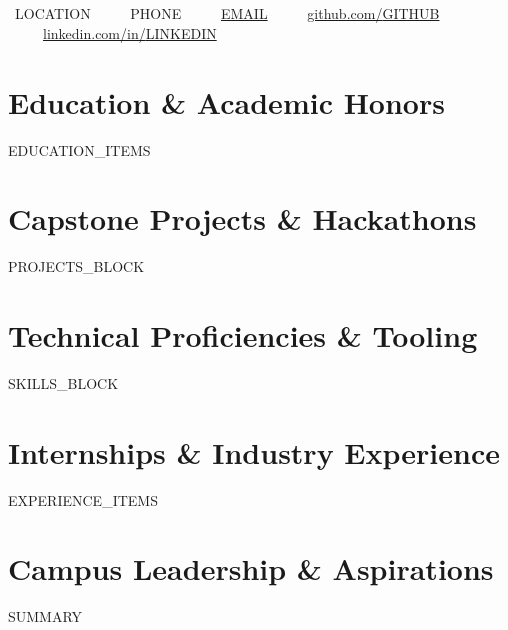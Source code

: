 \documentclass[10pt,letterpaper]{article}
\begin{document}
\begin{center}
  {\Huge \textbf{}} \\[3pt]
  {\normalsize \textbf{}} \\[5pt]
  \small
  \faMapMarker* \ {{LOCATION}} \ \ \textbar\ \ 
  \faPhone \ {{PHONE}} \ \ \textbar\ \ 
  \faEnvelope \ \href{mailto:{{EMAIL}}}{{{EMAIL}}} \ \ \textbar\ \ 
  \faGithub \ \href{https://{{GITHUB}}}{github.com/{{GITHUB}}} \ \ \textbar\ \ 
  \faLinkedin \ \href{https://{{LINKEDIN}}}{linkedin.com/in/{{LINKEDIN}}}
\end{center}

\vspace{-2pt}

\section{Education \& Academic Honors}
\small
{{EDUCATION_ITEMS}}

\section{Capstone Projects \& Hackathons}
\small
{{PROJECTS_BLOCK}}

\section{Technical Proficiencies \& Tooling}
\small
{{SKILLS_BLOCK}}

\section{Internships \& Industry Experience}
\small
{{EXPERIENCE_ITEMS}}

\section{Campus Leadership \& Aspirations}
\small
{{SUMMARY}}
\end{document}
